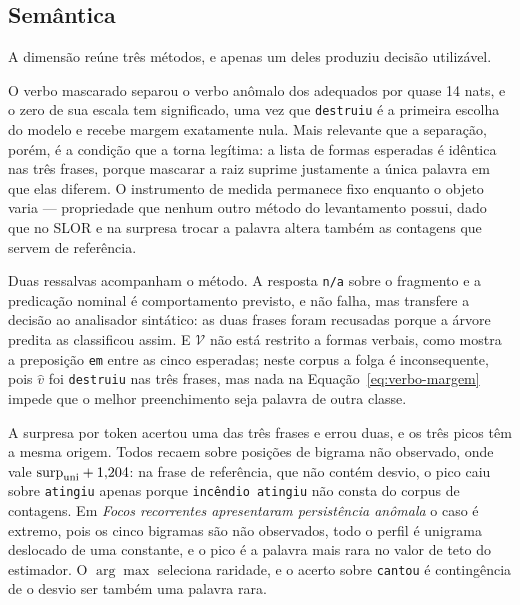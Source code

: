 \subsection{Semântica}
\label{disc:semantica}

\indent\indent A dimensão reúne três métodos, e apenas um deles produziu decisão utilizável.

O verbo mascarado separou o verbo anômalo dos adequados por quase 14 nats, e o zero de sua
escala tem significado, uma vez que \texttt{destruiu} é a primeira escolha do modelo e recebe
margem exatamente nula. Mais relevante que a separação, porém, é a condição que a torna
legítima: a lista de formas esperadas é idêntica nas três frases, porque mascarar a raiz
suprime justamente a única palavra em que elas diferem. O instrumento de medida permanece fixo
enquanto o objeto varia --- propriedade que nenhum outro método do levantamento possui, dado
que no SLOR e na surpresa trocar a palavra altera também as contagens que servem de referência.

Duas ressalvas acompanham o método. A resposta \texttt{n/a} sobre o fragmento e a predicação
nominal é comportamento previsto, e não falha, mas transfere a decisão ao analisador
sintático: as duas frases foram recusadas porque a árvore predita as classificou assim. E
$\mathcal{V}$ não está restrito a formas verbais, como mostra a preposição \texttt{em} entre
as cinco esperadas; neste corpus a folga é inconsequente, pois $\hat{v}$ foi \texttt{destruiu}
nas três frases, mas nada na Equação~\ref{eq:verbo-margem} impede que o melhor preenchimento
seja palavra de outra classe.

A surpresa por token acertou uma das três frases e errou duas, e os três picos têm a mesma
origem. Todos recaem sobre posições de bigrama não observado, onde vale
$\mathrm{surp}_{\mathrm{uni}} + 1{,}204$: na frase de referência, que não contém desvio, o pico caiu
sobre \texttt{atingiu} apenas porque \texttt{incêndio atingiu} não consta do corpus de
contagens. Em \emph{Focos recorrentes apresentaram persistência anômala} o caso é extremo,
pois os cinco bigramas são não observados, todo o perfil é unigrama deslocado de uma constante,
e o pico é a palavra mais rara no valor de teto do estimador. O $\arg\max$ seleciona
raridade, e o acerto sobre \texttt{cantou} é contingência de o desvio ser também uma palavra
rara.

